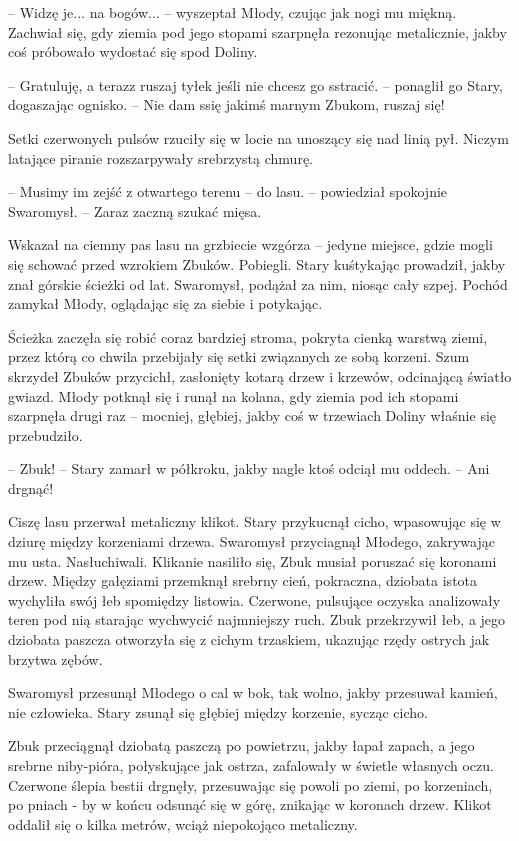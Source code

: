 \par\indent-- Widzę je... na bogów... -- wyszeptał Młody, czując jak nogi mu miękną. Zachwiał się, gdy ziemia pod jego stopami szarpnęła rezonując metalicznie, jakby coś próbowało wydostać się spod Doliny.
\par\indent-- Gratuluję, a terazz ruszaj tyłek jeśli nie chcesz go sstracić. -- ponaglił go Stary, dogaszając ognisko. -- Nie dam ssię jakimś marnym Zbukom, ruszaj się!
\par\indent Setki czerwonych pulsów rzuciły się w locie na unoszący się nad linią pył. Niczym latające piranie rozszarpywały srebrzystą chmurę. 
\par\noindent-- Musimy im zejść z otwartego terenu -- do lasu. -- powiedział spokojnie Swaromysł. -- Zaraz zaczną szukać mięsa.
\par\indent Wskazał na ciemny pas lasu na grzbiecie wzgórza -- jedyne miejsce, gdzie mogli się schować przed wzrokiem Zbuków. Pobiegli. Stary kuśtykając prowadził, jakby znał górskie ścieżki od lat. Swaromysł, podążał za nim, niosąc cały szpej. Pochód zamykał Młody, oglądając się za siebie i potykając. 
\par\indent Ścieżka zaczęła się robić coraz bardziej stroma, pokryta cienką warstwą ziemi, przez którą co chwila przebijały się setki związanych ze sobą korzeni. Szum skrzydeł Zbuków przycichł, zasłonięty kotarą drzew i krzewów, odcinającą światło gwiazd. Młody potknął się i runął na kolana, gdy ziemia pod ich stopami szarpnęła drugi raz --    mocniej, głębiej, jakby coś w trzewiach Doliny właśnie się przebudziło. 
\par\noindent-- Zbuk! -- Stary zamarł w półkroku, jakby nagle ktoś odciął mu oddech. -- Ani drgnąć!
\par\indent Ciszę lasu przerwał metaliczny klikot. Stary przykucnął cicho, wpasowując się w dziurę między korzeniami drzewa. Swaromysł przyciagnął Młodego, zakrywając mu usta. Nasłuchiwali. Klikanie nasiliło się, Zbuk musiał poruszać się koronami drzew. Między gałęziami przemknął srebrny cień, pokraczna, dziobata istota wychyliła swój łeb spomiędzy listowia. Czerwone, pulsujące oczyska analizowały teren pod nią starając wychwycić najmniejszy ruch. Zbuk przekrzywił łeb, a jego dziobata paszcza otworzyła się z cichym trzaskiem, ukazując rzędy ostrych jak brzytwa zębów.
\par\indent Swaromysł przesunął Młodego o cal w bok, tak wolno, jakby przesuwał kamień, nie człowieka. Stary zsunął się głębiej między korzenie, sycząc cicho.
\par\indent Zbuk przeciągnął dziobatą paszczą po powietrzu, jakby łapał zapach, a jego srebrne niby-pióra, połyskujące jak ostrza, zafalowały w świetle własnych oczu. Czerwone ślepia bestii drgnęły, przesuwając się powoli po ziemi, po korzeniach, po pniach - by w końcu odsunąć się w górę, znikając w koronach drzew. Klikot oddalił się o kilka metrów, wciąż niepokojąco metaliczny.
